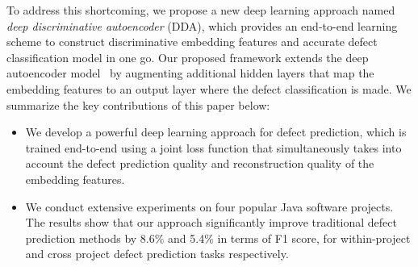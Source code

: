 To address this shortcoming, we propose a new deep learning approach named \emph{deep discriminative autoencoder} (DDA), which provides an end-to-end learning scheme to construct discriminative embedding features and accurate defect classification model in one go. Our proposed framework extends the deep autoencoder model~\cite{Vincent2010} by augmenting additional hidden layers that map the embedding features to an output layer where the defect classification is made.
We summarize the key contributions of this paper below:
\begin{itemize}
	\item We develop a powerful deep learning approach for defect prediction, which is trained end-to-end using a joint loss function that simultaneously takes into account the defect prediction quality and reconstruction quality of the embedding features.
	\item We conduct extensive experiments on four popular Java software projects. The results show that our approach significantly improve traditional defect prediction methods by 8.6\% and 5.4\% in terms of F1 score, for within-project and cross project defect prediction tasks respectively. 
\end{itemize}


